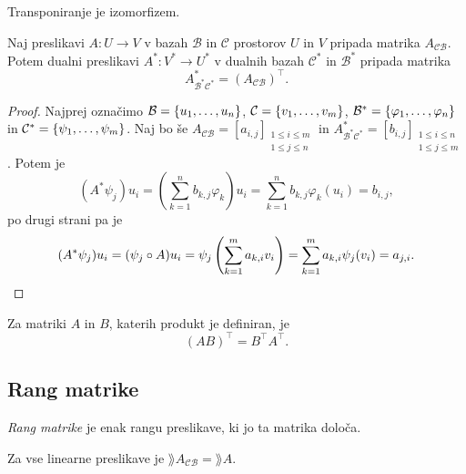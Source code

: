 \documentclass[12pt, a4paper]{article}
\begin{document}
\begin{posledica}
Transponiranje je izomorfizem.
\end{posledica}

\begin{izrek}
Naj preslikavi $A\colon U\to V$ v bazah $\mathcal{B}$ in $\mathcal{C}$ prostorov $U$ in $V$ pripada matrika $A_{\mathcal{CB}}$. Potem dualni preslikavi $A^*\colon V^*\to U^*$ v dualnih bazah $\mathcal{C}^*$ in $\mathcal{B}^*$ pripada matrika
\[
A^*_{\mathcal{B}^*\mathcal{C}^*}=(A_{\mathcal{CB}})^\top.
\]
\end{izrek}

\begin{proof}
Najprej označimo $\mathcal{B}=\left\{u_1,\dots,u_n\right\}$, $\mathcal{C}=\left\{v_1,\dots,v_m\right\}$, $\mathcal{B}^*=\left\{\varphi_1,\dots,\varphi_n\right\}$ in $\mathcal{C}^*=\left\{\psi_1,\dots,\psi_m\right\}$. Naj bo še $A_{\mathcal{CB}}=[a_{i,j}]_{
\substack{
1\leq i\leq m \\
1\leq j\leq n}}$ in 
$A^*_{\mathcal{B}^*\mathcal{C}^*}=[b_{i,j}]_{
\substack{
1\leq i\leq n \\
1\leq j\leq m}}$. Potem je
\[
(A^*\psi_j)u_i=\left(\sum_{k=1}^n b_{k,j}\varphi_k\right)u_i
=\sum_{k=1}^n b_{k,j}\varphi_k(u_i)
=b_{i,j},
\]
po drugi strani pa je
\[
(A^*\psi_j)u_i=(\psi_j\circ A)u_i
=\psi_j\left(\sum_{k=1}^m a_{k,i}v_i\right)
=\sum_{k=1}^m a_{k,i}\psi_j(v_i)
=a_{j,i}.\qedhere
\]
\end{proof}

\begin{posledica}
Za matriki $A$ in $B$, katerih produkt je definiran, je
\[
(AB)^\top=B^\top A^\top.
\]
\end{posledica}

\newpage

\subsection{Rang matrike}

\begin{definicija}
\emph{Rang matrike} je enak rangu preslikave, ki jo ta matrika določa.
\end{definicija}

\begin{trditev}\label{diagram:2}
Za vse linearne preslikave je $\rang A_{\mathcal{CB}}=\rang A$.
\end{trditev}
\end{document}
